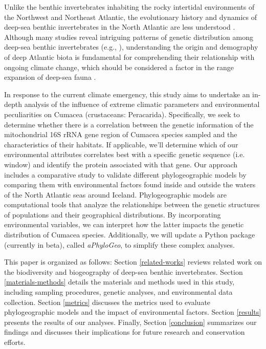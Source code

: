 Unlike the benthic invertebrates inhabiting the rocky intertidal environments of the Northwest and Northeast Atlantic, the evolutionary history and dynamics of deep-sea benthic invertebrates in the North Atlantic are less understood \citep{jennings_phylogeographic_2014}. Although many studies reveal intriguing patterns of genetic distribution among deep-sea benthic invertebrates (e.g., \citep{wilson_historical_1998, havermans_genetic_2013}), understanding the origin and demography of deep Atlantic biota is fundamental for comprehending their relationship with ongoing climate change, which should be considered a factor in the range expansion of deep-sea fauna \citep{jennings_phylogeographic_2014}.

In response to the current climate emergency, this study aims to undertake an in-depth analysis of the influence of extreme climatic parameters and environmental peculiarities on Cumacea (crustaceans: Peracarida). Specifically, we seek to determine whether there is a correlation between the genetic information of the mitochondrial 16S rRNA gene region of Cumacea species sampled and the characteristics of their habitats. If applicable, we'll determine which of our environmental attributes correlates best with a specific genetic sequence (i.e. window) and identify the protein associated with that gene. Our approach includes a comparative study to validate different phylogeographic models by comparing them with environmental factors found inside and outside the waters of the North Atlantic seas around Iceland. Phylogeographic models are computational tools that analyze the relationships between the genetic structures of populations and their geographical distributions. By incorporating environmental variables, we can interpret how the latter impacts the genetic distribution of Cumacea species. Additionally, we will update a Python package (currently in beta), called \textit{aPhyloGeo}, to simplify these complex analyses.

This paper is organized as follows: Section \autoref{related-works} reviews related work on the biodiversity and biogeography of deep-sea benthic invertebrates. Section \autoref{materials-methods} details the materials and methods used in this study, including sampling procedures, genetic analyses, and environmental data collection. Section \autoref{metrics} discusses the metrics used to evaluate phylogeographic models and the impact of environmental factors. Section \autoref{results} presents the results of our analyses. Finally, Section \autoref{conclusion} summarizes our findings and discusses their implications for future research and conservation efforts.

